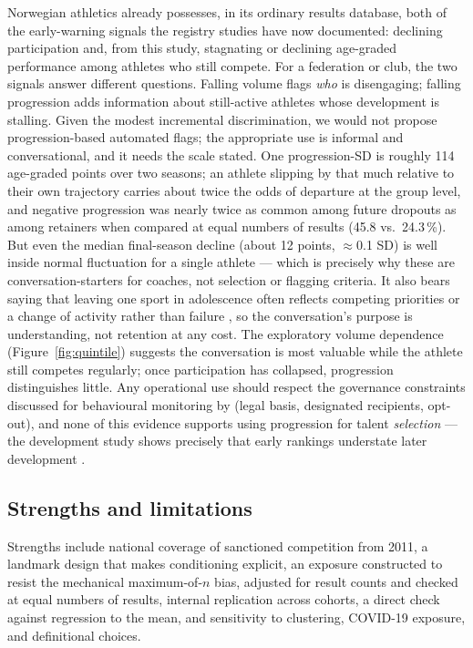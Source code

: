 \documentclass[12pt,a4paper]{article}
\begin{document}
Norwegian athletics already possesses, in its ordinary results database, both of the early-warning signals the registry studies have now documented: declining participation \citep{guttormsen2026dropout} and, from this study, stagnating or declining age-graded performance among athletes who still compete. For a federation or club, the two signals answer different questions. Falling volume flags \emph{who} is disengaging; falling progression adds information about still-active athletes whose development is stalling. Given the modest incremental discrimination, we would not propose progression-based automated flags; the appropriate use is informal and conversational, and it needs the scale stated. One progression-SD is roughly 114 age-graded points over two seasons; an athlete slipping by that much relative to their own trajectory carries about twice the odds of departure at the group level, and negative progression was nearly twice as common among future dropouts as among retainers when compared at equal numbers of results (45.8 vs.\ 24.3\,\%). But even the median final-season decline (about 12 points, $\approx$0.1 SD) is well inside normal fluctuation for a single athlete --- which is precisely why these are conversation-starters for coaches, not selection or flagging criteria. It also bears saying that leaving one sport in adolescence often reflects competing priorities or a change of activity rather than failure \citep{crane2015,fraserthomas2008}, so the conversation's purpose is understanding, not retention at any cost. The exploratory volume dependence (Figure~\ref{fig:quintile}) suggests the conversation is most valuable while the athlete still competes regularly; once participation has collapsed, progression distinguishes little. Any operational use should respect the governance constraints discussed for behavioural monitoring by \citet{guttormsen2026dropout} (legal basis, designated recipients, opt-out), and none of this evidence supports using progression for talent \emph{selection} --- the development study shows precisely that early rankings understate later development \citep{guttormsen2026development}.

\subsection{Strengths and limitations}

Strengths include national coverage of sanctioned competition from 2011, a landmark design that makes conditioning explicit, an exposure constructed to resist the mechanical maximum-of-$n$ bias, adjusted for result counts and checked at equal numbers of results, internal replication across cohorts, a direct check against regression to the mean, and sensitivity to clustering, COVID-19 exposure, and definitional choices.
\end{document}
